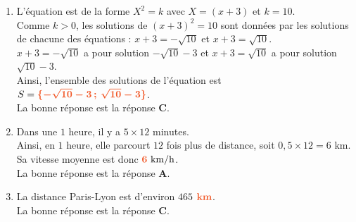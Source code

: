 \documentclass[a4paper,11pt]{article}
\begin{document}
\begin{seance}{}
\begin{enumerate}
\medskip
La bonne réponse est la réponse {\bfseries \color[HTML]{F15929}B}.

\item L'équation est de la forme $X^2=k$ avec $X=(x+3)$ et $k=10$.\\
        Comme $k>0$, les solutions de $(x+3)^2=10$ sont données par les solutions de chacune des équations :         $x+3=-\sqrt{10}$ et $x+3=\sqrt{10}$.\\
        $x+3=-\sqrt{10}$ a pour solution $-\sqrt{10}-3$ et 
        $x+3=\sqrt{10}$ a pour solution $\sqrt{10}-3$.\\
        Ainsi, l'ensemble des solutions de l'équation est $S={\color[HTML]{F15929}\boldsymbol{\{-\sqrt{10}-3\,;\,\sqrt{10}-3\}}}$.
         \\La bonne réponse est la réponse {\bfseries \color[HTML]{F15929}C}.

\item Dans une $1$ heure, il y a $5\times 12$ minutes.\\
      Ainsi, en $1$ heure, elle parcourt $12$ fois plus de distance, soit $0{,}5\times 12=6\text{ km}$.\\
      Sa vitesse moyenne est donc ${\color[HTML]{F15929}\boldsymbol{6}}\text{ km/h}$. \\La bonne réponse est la réponse {\bfseries \color[HTML]{F15929}A}.

\item La distance Paris-Lyon est d'environ $465$ ${\color[HTML]{F15929}\boldsymbol{\textbf{km}}}$.\\La bonne réponse est la réponse {\bfseries \color[HTML]{F15929}C}.

\end{enumerate}

\end{seance}
\end{document}
